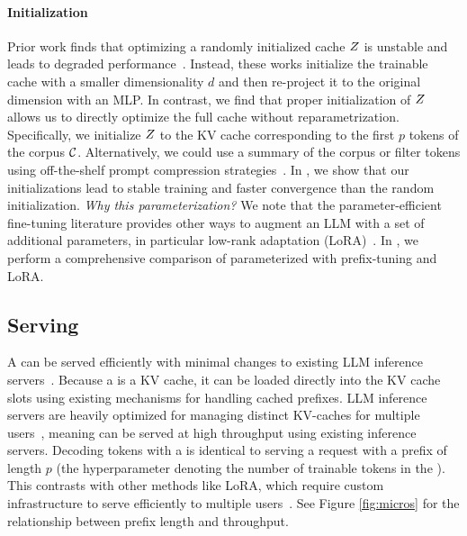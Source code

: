 \paragraph{Initialization}
Prior work finds that optimizing a randomly initialized cache $Z$ is unstable and leads to degraded performance~\cite{li2021prefix}.
Instead, these works initialize the trainable cache with a smaller dimensionality $d$ and then re-project it to the original dimension with an MLP.
In contrast, we find that proper initialization of $Z$ allows us to directly optimize the full cache without reparametrization.
Specifically, we initialize $Z$ to the KV cache corresponding to the first $p$ tokens of the corpus $\mathcal{C}$.
Alternatively, we could use a summary of the corpus or filter tokens using off-the-shelf prompt compression strategies~\cite{xiao2024duoattention}.
In , we show that our initializations lead to stable training and faster convergence than the random initialization.
\textit{Why this parameterization?} We note that the parameter-efficient fine-tuning literature provides other ways to augment an LLM with a set of additional parameters, in particular low-rank adaptation (LoRA)~\cite{li2021prefix,hu2022lora,lester2021power}.
In , we perform a comprehensive comparison of \artifacts parameterized with prefix-tuning and LoRA.
\vspace{-2mm}
\subsection{Serving \artifacts}
\label{sec:artifact-serving}
A \artifact can be served efficiently with minimal changes to existing LLM inference servers~\cite{zheng2024sglang,kwon2023efficient,juravsky2025tokasaurus}. Because a \artifact is a KV cache, it can be loaded directly into the KV cache slots using existing mechanisms for handling cached prefixes. LLM inference servers are heavily optimized for managing distinct KV-caches for multiple users~\cite{ye2025flashinfer}, meaning \artifacts can be served at high throughput using existing inference servers. Decoding tokens with a \artifact is identical to serving a request with a prefix of length $p$ (the hyperparameter denoting the number of trainable tokens in the \artifact). This contrasts with other methods like LoRA, which require custom infrastructure to serve efficiently to multiple users~\cite{chen2024punica}. See Figure \ref{fig:micros} for the relationship between prefix length and throughput.


